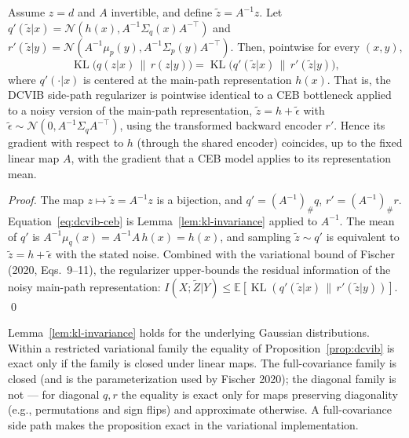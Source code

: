 \begin{proposition}\label{prop:dcvib}
Assume $z = d$ and $A$ invertible, and define $\tilde{z} = A^{-1} z$. Let
$q'(\tilde{z}|x) = \mathcal{N}(h(x), A^{-1}\Sigma_q(x) A^{-\top})$ and
$r'(\tilde{z}|y) = \mathcal{N}(A^{-1}\mu_p(y), A^{-1}\Sigma_p(y) A^{-\top})$.
Then, pointwise for every $(x, y)$,
\begin{equation}
\operatorname{KL}\big(q(z|x)\,\|\,r(z|y)\big)
= \operatorname{KL}\big(q'(\tilde{z}|x)\,\|\,r'(\tilde{z}|y)\big),
\label{eq:dcvib-ceb}
\end{equation}
where $q'(\cdot|x)$ is centered at the main-path representation $h(x)$.
That is, the DCVIB side-path regularizer is pointwise identical to a CEB bottleneck
applied to a noisy version of the main-path representation,
$\tilde{z} = h + \tilde{\epsilon}$ with $\tilde{\epsilon} \sim \mathcal{N}(0, A^{-1}\Sigma_q A^{-\top})$,
using the transformed backward encoder $r'$.
Hence its gradient with respect to $h$ (through the shared encoder) coincides, up to the
fixed linear map $A$, with the gradient that a CEB model applies to its representation mean.
\end{proposition}

\begin{proof}
The map $z \mapsto \tilde{z} = A^{-1}z$ is a bijection, and
$q' = (A^{-1})_\# q$, $r' = (A^{-1})_\# r$.
Equation~\eqref{eq:dcvib-ceb} is Lemma~\ref{lem:kl-invariance} applied to $A^{-1}$.
The mean of $q'$ is $A^{-1}\mu_q(x) = A^{-1}A\,h(x) = h(x)$, and sampling
$\tilde{z} \sim q'$ is equivalent to $\tilde{z} = h + \tilde{\epsilon}$ with the stated noise.
Combined with the variational bound of Fischer (2020, Eqs.~9--11), the regularizer
upper-bounds the residual information of the noisy main-path representation:
$I(X;\tilde{Z}|Y) \le \mathbb{E}[\operatorname{KL}(q'(\tilde{z}|x)\,\|\,r'(\tilde{z}|y))]$.
\hfill\qed
\end{proof}

\begin{remark}\label{rem:closure}
Lemma~\ref{lem:kl-invariance} holds for the underlying Gaussian distributions. Within a
restricted variational family the equality of Proposition~\ref{prop:dcvib} is exact only if
the family is closed under linear maps. The full-covariance family is closed (and is the
parameterization used by Fischer 2020); the diagonal family is not --- for diagonal $q, r$
the equality is exact only for maps preserving diagonality (e.g., permutations and sign
flips) and approximate otherwise. A full-covariance side path makes the proposition exact
in the variational implementation.
\end{remark}

